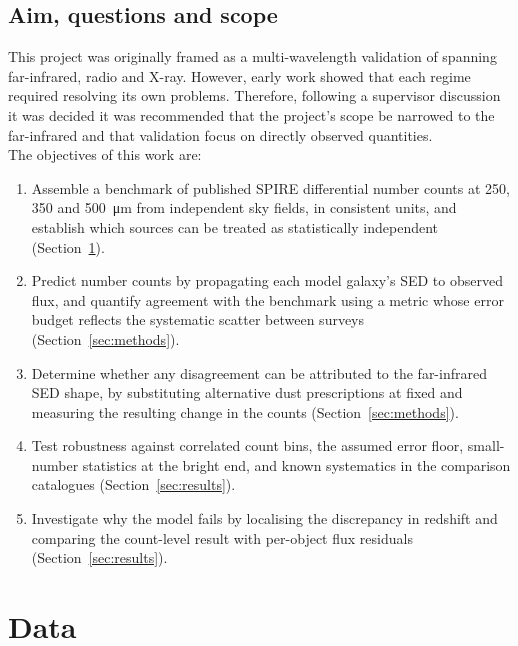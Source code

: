 \documentclass[12pt,a4paper]{article}
\begin{document}
\subsection{Aim, questions and scope}
\label{sec:intro:aims}

This project was originally framed as a multi-wavelength validation of \popcosmos{}
spanning far-infrared, radio and X-ray. However, early work showed that each regime
required resolving its own problems. Therefore, following a supervisor discussion it was decided it was recommended that the project's scope be narrowed to the far-infrared and that
validation focus on directly observed quantities. \\
The objectives of this work are:

\begin{enumerate}
  \item Assemble a benchmark of published SPIRE differential number counts at 250, 350
        and \SI{500}{\um} from independent sky fields, in consistent units, and
        establish which sources can be treated as statistically independent
        (Section~\ref{sec:data}).
  \item Predict \popcosmos{} number counts by propagating each model galaxy's SED to
        observed flux, and quantify agreement with the benchmark using a metric whose
        error budget reflects the systematic scatter between surveys
        (Section~\ref{sec:methods}).
  \item Determine whether any disagreement can be attributed to the far-infrared SED
        shape, by substituting alternative dust prescriptions at fixed \LIR{} and
        measuring the resulting change in the counts (Section~\ref{sec:methods}).
  \item Test robustness against correlated count bins, the assumed error floor,
        small-number statistics at the bright end, and known systematics in the
        comparison catalogues (Section~\ref{sec:results}).
  \item Investigate why the model fails by localising the discrepancy in redshift
        and comparing the count-level result with per-object flux residuals
        (Section~\ref{sec:results}).
\end{enumerate}

\section{Data}
\label{sec:data}
\end{document}
